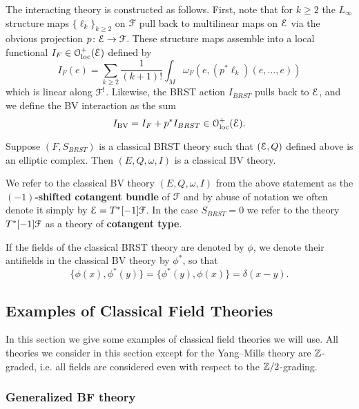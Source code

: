\documentclass[10pt, oneside]{article}
\begin{document}
The interacting theory is constructed as follows. First, note that for $k \geq 2$ the $L_\infty$ structure maps $\{\ell_k\}_{k \geq 2}$ on $\mathcal F$ pull back to multilinear maps on $\mathcal E$ via the obvious projection $p\colon \mathcal E\rightarrow \mathcal F$. These structure maps assemble into a local functional $I_F \in \mathcal{O}_{\rm loc}^+(\mathcal E)$ defined by
\[
I_F (e) = \sum_{k \geq 2} \frac{1}{(k+1)!} \int_M \omega_F(e, (p^*\ell_k) (e, \ldots, e))
\] 
which is linear along $\mathcal F^!$. Likewise, the BRST action $I_{BRST}$ pulls back to $\mathcal E$, and we define the BV interaction as the sum
\[
I_{\mathrm{BV}} = I_{F} + p^* I_{BRST} \in \mathcal{O}_{\rm loc}^+(\mathcal E) .
\]

\begin{lemma}
Suppose $(F, S_{BRST})$ is a classical BRST theory such that $(\mathcal E, Q)$ defined above is an elliptic complex. Then $(E, Q, \omega, I)$ is a classical BV theory.
\end{lemma}

We refer to the classical BV theory $(E, Q, \omega, I)$ from the above statement as the {\bf $(-1)$-shifted cotangent bundle} of $\mathcal F$ and by abuse of notation we often denote it simply by $\mathcal E = T^*[-1] \mathcal F$. In the case $S_{BRST} = 0$ we refer to the theory $T^*[-1] \mathcal F$ as a theory of {\bf cotangent type}.

If the fields of the classical BRST theory are denoted by $\phi$, we denote their antifields in the classical BV theory by $\phi^*$, so that
\[\{\phi(x), \phi^*(y)\} = \{\phi^*(y), \phi(x)\} = \delta(x-y).\]

\subsection{Examples of Classical Field Theories}

In this section we give some examples of classical field theories we will use. All theories we consider in this section except for the Yang--Mills theory are $\mathbb Z$-graded, i.e. all fields are considered even with respect to the $\mathbb Z/2$-grading.

\subsubsection{Generalized BF theory} \label{gen_BF_section}
\end{document}
